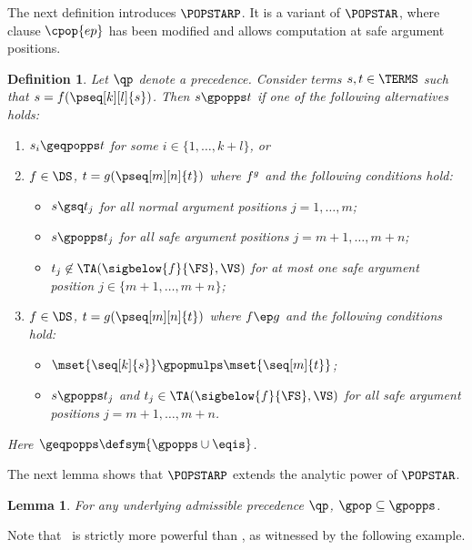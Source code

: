 \documentclass{LMCS}
\newtheorem{definition}[thm]{Definition}
\newtheorem{lemma}[thm]{Lemma}
\begin{document}
The next definition introduces $\POPSTARP$.
It is a variant of $\POPSTAR$, where 
clause $\cpop{ep}$ has been modified and allows computation at safe argument positions.
\begin{definition}\label{d:gpopps}
  Let ${\qp}$ denote a precedence.  
  Consider terms $s, t \in \TERMS$ such that $s = f(\pseq[k][l]{s})$.
  Then $s \gpopps t$ if one of the following alternatives holds:
  \begin{enumerate}[labelsep=*,leftmargin=*]
  \item\label{d:gpopps:st} $s_i \geqpopps t$ for some $i \in \{1,\dots,k+l\}$, or
  \item\label{d:gpopps:ia} $f \in \DS$, $t = g(\pseq[m][n]{t})$ where $f \sp g$ 
    and the following conditions hold:
    \begin{itemize}
    \item $s \gsq t_j$ for all normal argument positions $j = 1,\dots,m$;
    \item $s \gpopps t_j$ for all safe argument positions $j = m+1,\dots,m+n$;
    \item $t_j \not\in \TA(\sigbelow{f}{\FS},\VS)$ for at most one safe argument position $j \in \{m+1,\dots,m+n\}$;
    \end{itemize}
  \item\label{d:gpopps:ep} $f \in \DS$, $t = g(\pseq[m][n]{t})$ where $f \ep g$
    and the following conditions hold:
    \begin{itemize}
    \item $\mset{\seq[k]{s}} \gpopmulps \mset{\seq[m]{t}}$;
    \item $s \gpopps t_j$ and $t_j \in \TA(\sigbelow{f}{\FS},\VS)$ for all safe argument positions $j = m+1, \dots, m+n$.
    \end{itemize}
  \end{enumerate}
  Here ${\geqpopps} \defsym {\gpopps \cup \eqis}$.
\end{definition}

The next lemma shows that $\POPSTARP$ extends the analytic power of $\POPSTAR$.
\begin{lemma}\label{l:psextends}
  For any underlying admissible precedence $\qp$, ${\gpop} \subseteq {\gpopps}$.
\end{lemma}
Note that \POPSTARP~is strictly more powerful than \POPSTAR, as witnessed by 
the following example.
\end{document}
